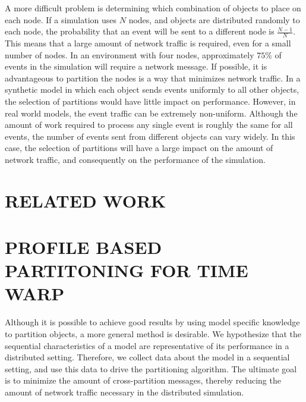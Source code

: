 \documentclass{wscpaperproc}
\begin{document}
A more difficult problem is determining which combination of objects to place on each node. If a simulation uses \(N\) nodes, and objects are distributed randomly to each node, the probability that an event will be sent to a different node is \(\frac{N-1}{N}\). This means that a large amount of network traffic is required, even for a small number of nodes. In an environment with four nodes, approximately \(75\%\) of events in the simulation will require a network message. If possible, it is advantageous to partition the nodes is a way that minimizes network traffic. In a synthetic model in which each object sends events uniformly to all other objects, the selection of partitions would have little impact on performance. However, in real world models, the event traffic can be extremely non-uniform. Although the amount of work required to process any single event is roughly the same for all events, the number of events sent from different objects can vary widely. In this case, the selection of partitions will have a large impact on the amount of network traffic, and consequently on the performance of the simulation.


\section{RELATED WORK}\label{sec:related}


\section{PROFILE BASED PARTITONING FOR TIME WARP}\label{sec:partitioning}

Although it is possible to achieve good results by using model specific knowledge to partition objects, a more general method is desirable. We hypothesize that the sequential characteristics of a model are representative of its performance in a distributed setting. Therefore, we collect data about the model in a sequential setting, and use this data to drive the partitioning algorithm. The ultimate goal is to minimize the amount of cross-partition messages, thereby reducing the amount of network traffic necessary in the distributed simulation. 
\end{document}
